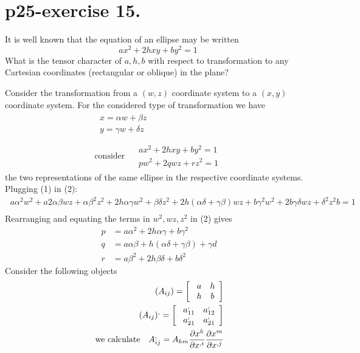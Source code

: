 \section{p25-exercise 15.}
\begin{tcolorbox}
It is well known that the equation of an ellipse may be written $$ ax^2+2hxy+by^2 =1$$
What is the tensor character of $a,h, b$ with respect to transformation to any Cartesian coordinates (rectangular or oblique) in the plane?
\end{tcolorbox}
Consider the transformation from a $(w,z)$ coordinate system to a $(x,y)$ coordinate system. For the considered type of transformation we have
\begin {align}
\begin{array}{c}
\ x = \alpha w + \beta z\\
\ y = \gamma w + \delta z\\
  \end{array}\\
\text{consider}\quad \begin{array}{c}
\ ax^2+2hxy+by^2 =1\\
\ pw^2+2qwz+rz^2 =1
  \end{array}
\end{align}
the two representations of the same ellipse in the respective coordinate systems. Plugging (1) in (2):
\begin {align}
\ a\alpha^2 w^2 + a 2 \alpha \beta w z + \alpha \beta^2 z^2 +2h \alpha \gamma w^2 +\beta \delta z^2+2h(\alpha \delta + \gamma \beta) w z + b \gamma^2 w^2 + 2 b \gamma \delta w z +\delta^2 z^2 b = 1\\
\end{align}
Rearranging and equating the terms in $w^2, wz, z^2$ in (2) gives
\begin{align}
\ p &= a \alpha^2 + 2 h \alpha \gamma + b \gamma^2\\
\ q &=  a \alpha \beta + h(\alpha \delta + \gamma \beta) + \gamma d\\
\ r &= a \beta^2 + 2 h \beta \delta +b \delta^2
\end{align}
Consider the following objects
\begin {align}
\ (A_{ij}) = \left[ { \begin{array}{cc}
  \ a &  h\\
  \ h   &b\\
  \end{array}} \right] \\
  \ (A_{ij})^{,} = \left[ { \begin{array}{cc}
  \ a^{,}_{11} &  a^{,}_{12}\\
  \ a^{,}_{21}  & a^{,}_{21}\\
  \end{array}} \right] \\
  \text{ we calculate}\quad A^{,}_{ij} = A_{km}\pdv{x^k}{x^{,i}}\pdv{x^m}{x^{,j}}
\end{align}
